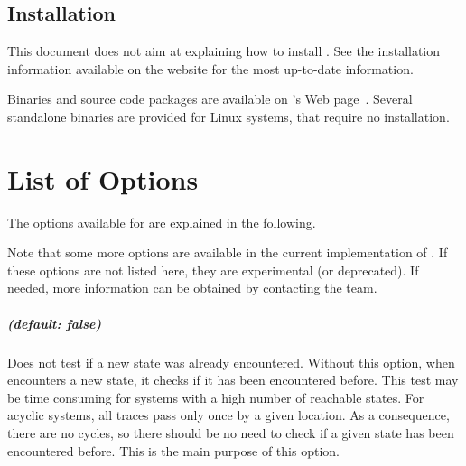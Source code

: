 \section{Installation}

This document does not aim at explaining how to install \imitator{}.
See the installation information available on the website for the most up-to-date information.

Binaries and source code packages are available on \imitator{}'s Web page~\cite{imitator}.
Several standalone binaries are provided for Linux systems, that require no installation.








\chapter{List of Options}\label{chapter:options}

The options available for \imitator{} are explained in the following.

Note that some more options are available in the current implementation of \imitator{}.
If these options are not listed here, they are experimental (or deprecated).
If needed, more information can be obtained by contacting the \imitator{} team.


\paragraph{ (default: false)}
Does not test if a new state was already encountered.
Without this option, when \imitator{} encounters a new state, it checks if it has been encountered before.
This test may be time consuming for systems with a high number of reachable states.
For acyclic systems, all traces pass only once by a given location.
As a consequence, there are no cycles, so there should be no need to check if a given state has been encountered before.
This is the main purpose of this option.

